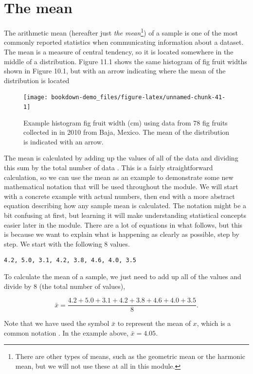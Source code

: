 \documentclass[
]{scrbook}
\begin{document}
\hypertarget{the-mean}{%
\section{The mean}\label{the-mean}}

The arithmetic mean (hereafter just \emph{the mean}\footnote{There are other types of means, such as the geometric mean or the harmonic mean, but we will not use these at all in this module.}) of a sample is one of the most commonly reported statistics when communicating information about a dataset.
The mean is a measure of central tendency, so it is located somewhere in the middle of a distribution.
Figure 11.1 shows the same histogram of fig fruit widths shown in Figure 10.1, but with an arrow indicating where the mean of the distribution is located

\begin{figure}
\texttt{[image: bookdown-demo\_files/figure-latex/unnamed-chunk-41-1]} \caption{Example histogram fig fruit width (cm) using data from 78 fig fruits collected in in 2010 from Baja, Mexico. The mean of the distribution is indicated with an arrow.}\label{fig:unnamed-chunk-41}
\end{figure}

The mean is calculated by adding up the values of all of the data and dividing this sum by the total number of data \citep{Sokal1995}.
This is a fairly straightforward calculation, so we can use the mean as an example to demonstrate some new mathematical notation that will be used throughout the module.
We will start with a concrete example with actual numbers, then end with a more abstract equation describing how any sample mean is calculated.
The notation might be a bit confusing at first, but learning it will make understanding statistical concepts easier later in the module.
There are a lot of equations in what follows, but this is because we want to explain what is happening as clearly as possible, step by step.
We start with the following 8 values.

\begin{verbatim}
4.2, 5.0, 3.1, 4.2, 3.8, 4.6, 4.0, 3.5
\end{verbatim}

To calculate the mean of a sample, we just need to add up all of the values and divide by 8 (the total number of values),

\[\bar{x} = \frac{4.2 + 5.0 + 3.1 + 4.2 + 3.8 + 4.6 + 4.0 + 3.5}{8}.\]

Note that we have used the symbol \(\bar{x}\) to represent the mean of \(x\), which is a common notation \citep{Sokal1995}.
In the example above, \(\bar{x} = 4.05\).
\end{document}
